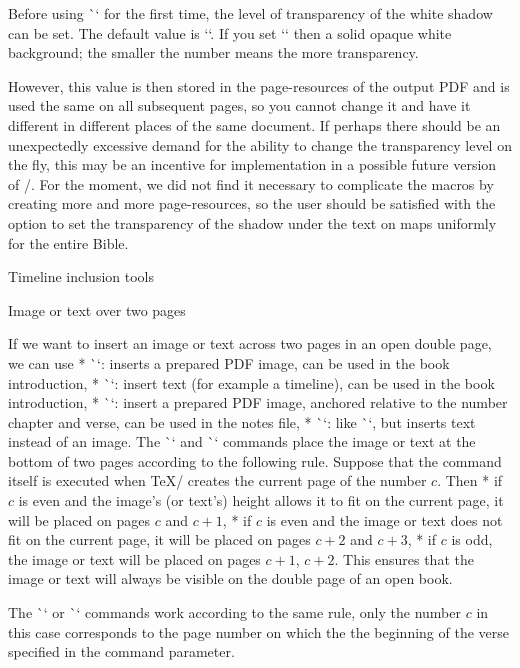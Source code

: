 {{Before using \`\putstext` for the first time, the level of transparency of the white shadow can be set.  The default value is `\def\shadowparameter{.1}`. 
If you set `\def\shadowparameter{1}` then a solid opaque white background; the smaller the number means the more transparency. 

However, this value is then stored in the page-resources of the output PDF and is used 
the same  on all subsequent pages, so you cannot change it and have it  different in 
different places of the same document. 
If perhaps there should be an unexpectedly excessive 
demand for the ability to change the transparency level on the fly, this may be an incentive for 
implementation in a possible future version of \OpBible/.
For the moment, we did not find it necessary to complicate the macros by creating more and more 
page-resources, so the user should be satisfied with the option to set the transparency of the 
shadow under the text on maps uniformly for the entire Bible.  



\sec Timeline inclusion tools

\secc[spanimage] Image or text over two pages

If we want to insert an image or text across two pages in an open double page, we can
use
\begitems
* \`\insertSpanImage`: inserts a prepared PDF image, can be used in the book introduction,
* \`\insertSpanText`: insert text (for example a timeline), can be used in the book introduction,
* \`\putSpanImage`: insert a prepared PDF image, anchored relative to the number
   chapter and verse, can be used in the notes file,
* \`\putSpanText`: like \`\putSpanImage`, but inserts text instead of an image.
\enditems
The \`\insertSpanImage` and \`\insertSpanText` commands place the image or text 
at the bottom of two pages according to the following rule. Suppose that
the command itself is executed when \TeX/ creates the current page of
the number $c$. Then
\begitems
* if $c$ is even and the image's (or text's) height allows it to fit on the current page,
  it will be placed on pages $c$ and $c+1$,
* if $c$ is even and the image or text does not fit on the current page,
  it will be placed on pages $c+2$ and $c+3$,
* if $c$ is odd, the image or text will be placed on pages $c+1$, $c+2$.
\enditems
This ensures that the image or text will always be visible on the double page
of an open book.

The \`\putSpanImage` or \`\putSpanText` commands work according to the same rule,
only the number $c$ in this case corresponds to the page number on which the
the beginning of the verse specified in the command parameter.

}}
